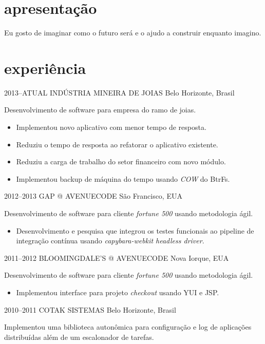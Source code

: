 \documentclass[]{friggeri-cv}
\begin{document}
\section{apresentação}
Eu gosto de imaginar como o futuro será e o ajudo a construir enquanto imagino.


\section{experiência}

\begin{entrylist}


\entry
{2013--ATUAL}
{INDÚSTRIA MINEIRA DE JOIAS}
{Belo Horizonte, Brasil}
{ Desenvolvimento de software para empresa do ramo de joias.  

  \begin{itemize}
    \item Implementou novo aplicativo com menor tempo de resposta. 
    \item Reduziu o tempo de resposta ao refatorar o aplicativo existente.  
    \item Reduziu a carga de trabalho do setor financeiro com novo módulo.
    \item Implementou backup de máquina do tempo usando \textit{COW} do BtrFs. 
  \end{itemize}
  }


\entry
{2012--2013}
{GAP @ AVENUECODE}
{São Francisco, EUA}
{ Desenvolvimento de software para cliente \textit{fortune 500} usando metodologia ágil.  
  \begin{itemize}
    \item Desenvolvimento e pesquisa que integrou os testes funcionais ao pipeline de integração contínua usando \textit{capybara-webkit headless driver}.
  \end{itemize}
}



\entry
{2011--2012}
{BLOOMINGDALE'S @ AVENUECODE}
{Nova Iorque, EUA}
{ Desenvolvimento de software para cliente \textit{fortune 500} usando metodologia ágil.  

  \begin{itemize}
    \item Implementou interface para projeto \textit{checkout} usando YUI e JSP.
  \end{itemize}
}


\entry
{2010--2011}
{COTAK SISTEMAS}
{Belo Horizonte, Brasil}
{ Implementou uma biblioteca autonômica para configuração e log de aplicações distribuídas além de um escalonador de tarefas. 

}
\end{entrylist}
\end{document}
